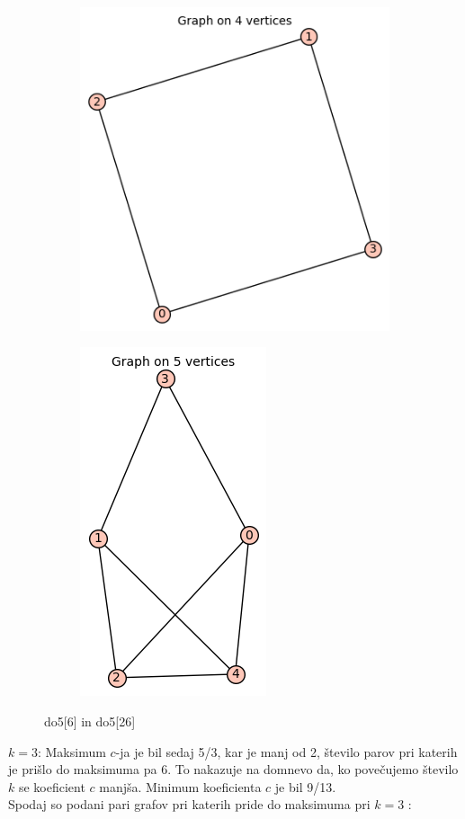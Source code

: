 \documentclass[12pt, a4paper]{article}
\begin{document}
\begin{center}
\begin{figure}
\centering
\begin{subfigure}{0.5\textwidth}
  \centering
  \includegraphics[width=0.6\linewidth]{do5[6]}
\end{subfigure}%
\begin{subfigure}{0.5\textwidth}
  \centering
  \includegraphics[width=0.4\linewidth]{do5[26]}
\end{subfigure}
\caption{do5[6] in do5[26]}
\label{fig:test}
\end{figure}

\end{center}
$k=3$:  Maksimum $c$-ja je bil sedaj 5/3, kar je manj od 2, število parov pri katerih je prišlo do maksimuma pa 6. To nakazuje na domnevo da, ko povečujemo število $k$ se koeficient $c$ manjša. Minimum koeficienta $c$ je bil 9/13. \\
Spodaj so podani pari grafov pri katerih pride do maksimuma pri $k=3$ :
\end{document}
